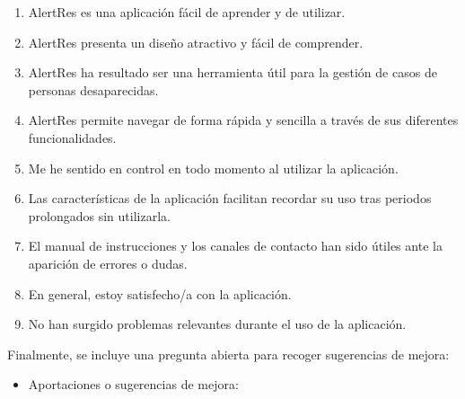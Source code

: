 \begin{enumerate}
    \item AlertRes es una aplicación fácil de aprender y de utilizar.
    \item AlertRes presenta un diseño atractivo y fácil de comprender.
    \item AlertRes ha resultado ser una herramienta útil para la gestión de casos de personas desaparecidas.
    \item AlertRes permite navegar de forma rápida y sencilla a través de sus diferentes funcionalidades.
    \item Me he sentido en control en todo momento al utilizar la aplicación.
    \item Las características de la aplicación facilitan recordar su uso tras periodos prolongados sin utilizarla.
    \item El manual de instrucciones y los canales de contacto han sido útiles ante la aparición de errores o dudas.
    \item En general, estoy satisfecho/a con la aplicación.
    \item No han surgido problemas relevantes durante el uso de la aplicación.
\end{enumerate}

Finalmente, se incluye una pregunta abierta para recoger sugerencias de mejora:

\begin{itemize}
    \item Aportaciones o sugerencias de mejora:
\end{itemize}

